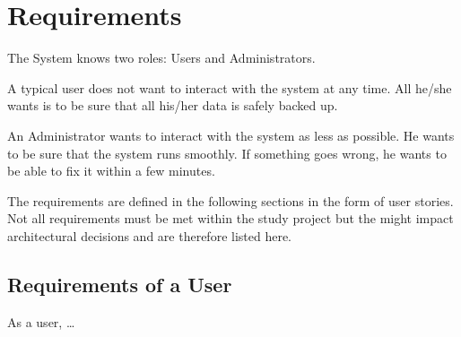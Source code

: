 \chapter{Requirements}

The System knows two roles: Users and Administrators.

A typical user does not want to interact with the system at any time.
All he/she wants is to be sure that all his/her data is safely backed
up.

An Administrator wants to interact with the system as less as possible.
He wants to be sure that the system runs smoothly. If something goes
wrong, he wants to be able to fix it within a few minutes.


The requirements are defined in the following sections in the form of user stories.
Not all requirements must be met within the study project but the might
impact architectural decisions and are therefore listed here.

\section{Requirements of a User}
As a user, \ldots{}

